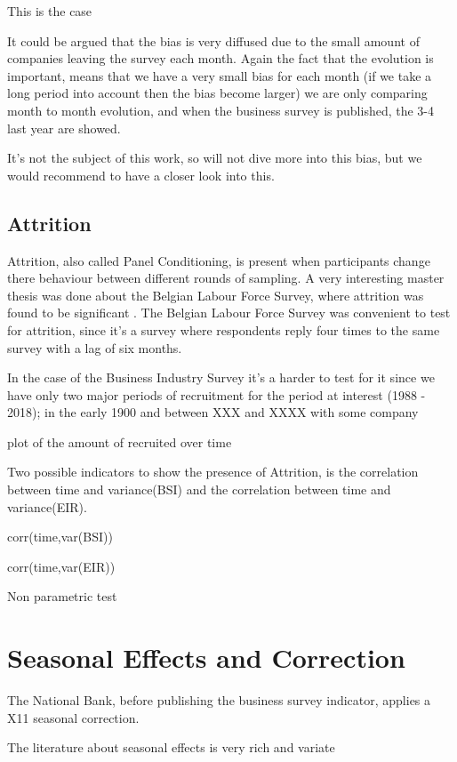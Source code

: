 \documentclass[12pt,a4paper,oneside]{book}
\begin{document}
This is the case

It could be argued that the bias is very diffused due to the small amount of companies leaving the survey each month. Again the fact that the evolution is important, means that we have a very small bias for each month (if we take a long period into account then the bias become larger) we are only comparing month to month evolution, and when the business survey is published, the 3-4 last year are showed.

It's not the subject of this work, so will not dive more into this bias, but we would recommend to have a closer look into this.

\subsection{Attrition}
Attrition, also called Panel Conditioning, is present when participants change there behaviour between different rounds of sampling. 
A very interesting master thesis was done about the Belgian Labour Force Survey, where attrition was found to be significant \cite{priyana_hardjawidjaksana_investigating_2019}. 
The Belgian Labour Force Survey was convenient to test for attrition, since it's a survey where respondents reply four times to the same survey with a lag of six months.

In the case of the Business Industry Survey it's a harder to test for it since we have only two major periods of recruitment for the period at interest (1988 - 2018); in the early 1900 and between XXX and XXXX with some company 

plot of the amount of recruited over time

Two possible indicators to show the presence of Attrition, is the correlation between time and variance(BSI) and the correlation between time and variance(EIR).

corr(time,var(BSI))

corr(time,var(EIR))



Non parametric test \cite{das_nonparametric_2011}


\section{Seasonal Effects and Correction}
The National Bank, before publishing the business survey indicator, applies a X11 seasonal correction.

The literature about seasonal effects is very rich and variate
\end{document}
